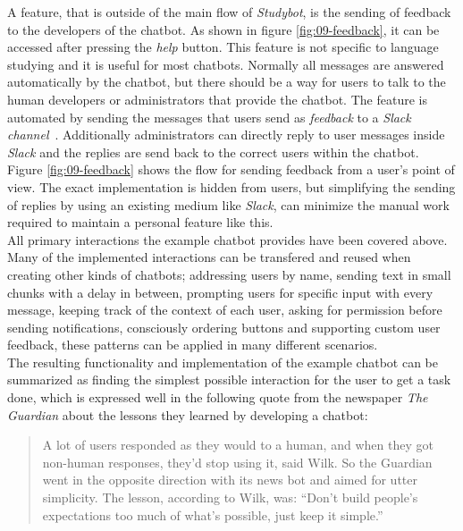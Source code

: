 \label{slackhook}

A feature, that is outside of the main flow of \emph{Studybot}, is the sending of feedback to the developers of the chatbot.
As shown in figure \ref{fig:09-feedback}, it can be accessed after pressing the \emph{help} button.
This feature is not specific to language studying and it is useful for most chatbots.
Normally all messages are answered automatically by the chatbot,
but there should be a way for users to talk to the human developers or administrators that provide the chatbot.
The feature is automated by sending the messages that users send as \emph{feedback}
to a \emph{Slack channel}~\cite{slack}.
Additionally administrators can directly reply to user messages inside \emph{Slack}
and the replies are send back to the correct users within the chatbot.
\\
Figure \ref{fig:09-feedback} shows the flow for sending feedback from a user's point of view.
The exact implementation is hidden from users,
but simplifying the sending of replies by using an existing medium like \emph{Slack},
can minimize the manual work required to maintain a personal feature like this.
\\


All primary interactions the example chatbot provides have been covered above.
Many of the implemented interactions can be transfered and reused when creating other kinds of chatbots;
addressing users by name,
sending text in small chunks with a delay in between,
prompting users for specific input with every message,
keeping track of the context of each user,
asking for permission before sending notifications,
consciously ordering buttons and
supporting custom user feedback,
these patterns can be applied in many different scenarios.
\\

The resulting functionality and implementation of the example chatbot can be summarized as finding the simplest possible interaction for the user to get a task done, which is expressed well in the following quote from the newspaper \emph{The Guardian} about the lessons they learned by developing a chatbot:

\begin{quote}
A lot of users responded as they would to a human, and when they got non-human responses, they’d stop using it, said Wilk. So the Guardian went in the opposite direction with its news bot and aimed for utter simplicity. The lesson, according to Wilk, was: “Don’t build people’s expectations too much of what’s possible, just keep it simple.”~\cite{digiday}
\end{quote}
